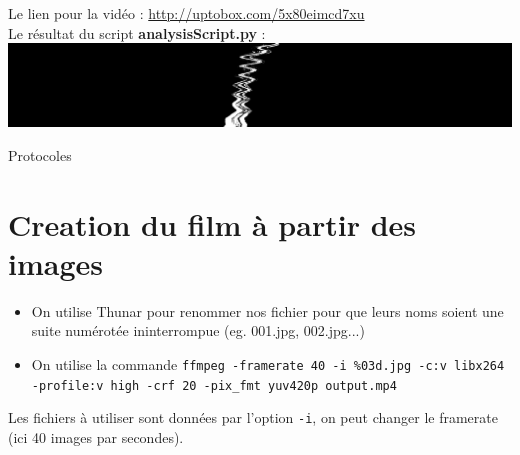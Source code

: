 \documentclass[10pt,a4paper]{article}
\begin{document}
Le lien pour la vidéo : \url{http://uptobox.com/5x80eimcd7xu}\\

Le résultat du script \textbf{analysisScript.py} :\\
\includegraphics[width = \linewidth]{imTLBWv1.jpg}


\newpage
\begin{center}
{\Huge Protocoles}
\end{center}
\appendix

\section{Creation du film à partir des images \label{film}}
\begin{itemize}
\item On utilise Thunar pour renommer nos fichier pour que leurs noms soient une suite numérotée ininterrompue (eg. 001.jpg, 002.jpg...)
\item On utilise la commande \texttt{ffmpeg -framerate 40 -i \%03d.jpg -c:v libx264 -profile:v high -crf 20 -pix\_fmt yuv420p output.mp4}
\end{itemize}
Les fichiers à utiliser sont données par l'option \texttt{-i}, on peut changer le framerate (ici 40 images par secondes).
\end{document}
